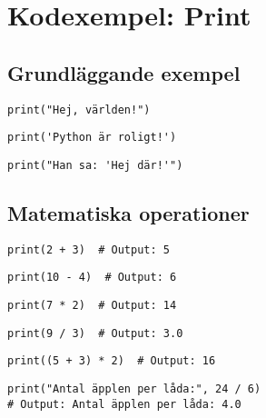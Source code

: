 \section{Kodexempel: Print}
\label{examples:print}
\subsection*{Grundläggande exempel}

\begin{lstlisting}[title=Exempel 1: Skriv ut en enkel text]
print("Hej, världen!")
\end{lstlisting}

\begin{lstlisting}[title=Exempel 2: Enkelcitat för text]
print('Python är roligt!')
\end{lstlisting}

\begin{lstlisting}[title=Exempel 3: Kombinera citattecken]
print("Han sa: 'Hej där!'")
\end{lstlisting}

\subsection*{Matematiska operationer}

\begin{lstlisting}[title=Exempel 4: Addition]
print(2 + 3)  # Output: 5
\end{lstlisting}

\begin{lstlisting}[title=Exempel 5: Subtraktion]
print(10 - 4)  # Output: 6
\end{lstlisting}

\begin{lstlisting}[title=Exempel 6: Multiplikation]
print(7 * 2)  # Output: 14
\end{lstlisting}

\begin{lstlisting}[title=Exempel 7: Division]
print(9 / 3)  # Output: 3.0
\end{lstlisting}

\begin{lstlisting}[title=Exempel 8: Parenteser ändrar ordning]
print((5 + 3) * 2)  # Output: 16
\end{lstlisting}

\begin{lstlisting}[title=Exempel 9: Praktisk tillämpning]
print("Antal äpplen per låda:", 24 / 6)
# Output: Antal äpplen per låda: 4.0
\end{lstlisting}

